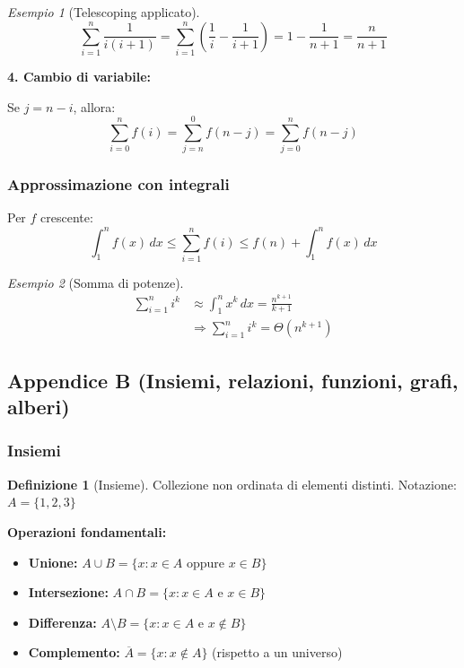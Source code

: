 \documentclass[a4paper, 11pt]{article}
\theoremstyle{definition}
\newtheorem{definizione}{Definizione}[section]
\theoremstyle{remark}
\newtheorem{esempio}{Esempio}[section]
\theoremstyle{remark}
\begin{document}
	\begin{esempio}[Telescoping applicato]
		\[
		\sum_{i=1}^{n} \frac{1}{i(i+1)} = \sum_{i=1}^{n} \left(\frac{1}{i} - \frac{1}{i+1}\right) = 1 - \frac{1}{n+1} = \frac{n}{n+1}
		\]
	\end{esempio}
	
	\textbf{4. Cambio di variabile:}
	
	Se $j = n - i$, allora:
	\[
	\sum_{i=0}^{n} f(i) = \sum_{j=n}^{0} f(n-j) = \sum_{j=0}^{n} f(n-j)
	\]
	
	\subsubsection{Approssimazione con integrali}
	
	Per $f$ crescente:
	\[
	\int_{1}^{n} f(x)\,dx \leq \sum_{i=1}^{n} f(i) \leq f(n) + \int_{1}^{n} f(x)\,dx
	\]
	
	\begin{esempio}[Somma di potenze]
		\begin{align*}
			\sum_{i=1}^{n} i^k &\approx \int_{1}^{n} x^k\,dx = \frac{n^{k+1}}{k+1} \\
			&\Rightarrow \sum_{i=1}^{n} i^k = \Theta(n^{k+1})
		\end{align*}
	\end{esempio}
	
	\subsection{Appendice B (Insiemi, relazioni, funzioni, grafi, alberi)}
	
	\subsubsection{Insiemi}
	
	\begin{definizione}[Insieme]
		Collezione non ordinata di elementi distinti. Notazione: $A = \{1, 2, 3\}$
	\end{definizione}
	
	\textbf{Operazioni fondamentali:}
	\begin{itemize}
		\item \textbf{Unione:} $A \cup B = \{x : x \in A \text{ oppure } x \in B\}$
		\item \textbf{Intersezione:} $A \cap B = \{x : x \in A \text{ e } x \in B\}$
		\item \textbf{Differenza:} $A \setminus B = \{x : x \in A \text{ e } x \notin B\}$
		\item \textbf{Complemento:} $\overline{A} = \{x : x \notin A\}$ (rispetto a un universo)
	\end{itemize}
	
\end{document}

